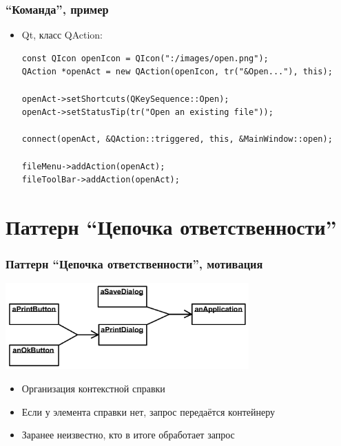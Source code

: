 \documentclass{../../slides-style}
\begin{document}
    \begin{frame}[fragile]
        \frametitle{``Команда'', пример}
        \begin{itemize}
            \item Qt, класс QAction:
            \begin{verbatim}
const QIcon openIcon = QIcon(":/images/open.png");
QAction *openAct = new QAction(openIcon, tr("&Open..."), this);

openAct->setShortcuts(QKeySequence::Open);
openAct->setStatusTip(tr("Open an existing file"));

connect(openAct, &QAction::triggered, this, &MainWindow::open);

fileMenu->addAction(openAct);
fileToolBar->addAction(openAct);
            \end{verbatim}
        \end{itemize}
\end{frame}

    \section{Паттерн ``Цепочка ответственности''}

    \begin{frame}
        \frametitle{Паттерн ``Цепочка ответственности'', мотивация}
        \begin{center}
            \includegraphics[width=0.7\textwidth]{chainOfResponsibilityExample.png}
        \end{center}
        \begin{itemize}
            \item Организация контекстной справки
            \item Если у элемента справки нет, запрос передаётся контейнеру
            \item Заранее неизвестно, кто в итоге обработает запрос
        \end{itemize}
    \end{frame}
\end{document}
